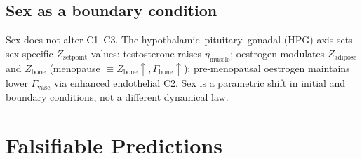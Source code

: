 \documentclass[aps,pre,twocolumn,superscriptaddress,floatfix]{revtex4-2}
\begin{document}
\subsection{Sex as a boundary condition}

Sex does not alter C1--C3.  The hypothalamic--pituitary--gonadal
(HPG) axis sets sex-specific $Z_{\text{setpoint}}$ values:
testosterone raises $\eta_{\text{muscle}}$;
oestrogen modulates $Z_{\text{adipose}}$ and $Z_{\text{bone}}$
(menopause $\equiv Z_{\text{bone}} \uparrow,
\Gamma_{\text{bone}} \uparrow$);
pre-menopausal oestrogen maintains lower
$\Gamma_{\text{vasc}}$ via enhanced endothelial C2.
Sex is a parametric shift in initial and boundary
conditions, not a different dynamical law.


\section{Falsifiable Predictions}
\label{sec:predictions}
\end{document}
